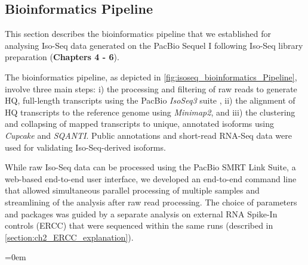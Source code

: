 \clearpage
\subsection{Bioinformatics Pipeline} 
\label{section:isoseq_bioinformatics}
This section describes the bioinformatics pipeline that we established for analysing Iso-Seq data generated on the PacBio Sequel I following Iso-Seq library preparation (\textbf{Chapters 4 - 6}). 

The bioinformatics pipeline, as depicted in \cref{fig:isoseq_bioinformatics_Pipeline}, involve three main steps: i) the processing and filtering of raw reads to generate HQ, full-length transcripts using the PacBio \textit{IsoSeq3} suite \cite{Gordon2015}, ii) the alignment of HQ transcripts to the reference genome using \textit{Minimap2}\cite{Li2018}, and iii) the clustering and collapsing of mapped transcripts to unique, annotated isoforms using \textit{Cupcake}\cite{TsengCupcake} and \textit{SQANTI}\cite{Tardaguila2018}. Public annotations and short-read RNA-Seq data were used for validating Iso-Seq-derived isoforms. 

While raw Iso-Seq data can be processed using the PacBio SMRT Link Suite, a web-based end-to-end user interface, we developed an end-to-end command line that allowed simultaneous parallel processing of multiple samples and streamlining of the analysis after raw read processing. The choice of parameters and packages was guided by a separate analysis on external RNA Spike-In controls (ERCC) that were sequenced within the same runs (described in \cref{section:ch2_ERCC_explanation}). 

\begingroup
\parindent=0em
\localtableofcontents 
\endgroup


